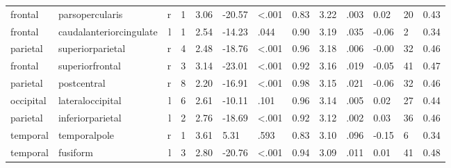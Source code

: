 \documentclass{article}
\begin{document}
\begin{longtable}{llrR{1.3cm}R{1cm}R{1.3cm}R{1cm}R{1cm}R{1.3cm}R{1cm}R{1.8cm}R{1.3cm}R{1.8cm}}
   frontal &           parsopercularis &    r &         1 &                  3.06 &           -20.57 &      \textless.001 &                               0.83 &                          3.22 &                            .003 &   0.02 &     20 &      0.43 \\
   frontal &   caudalanteriorcingulate &    l &         1 &                  2.54 &           -14.23 &               .044 &                               0.90 &                          3.19 &                            .035 &  -0.06 &      2 &      0.34 \\
  parietal &          superiorparietal &    r &         4 &                  2.48 &           -18.76 &      \textless.001 &                               0.96 &                          3.18 &                            .006 &  -0.00 &     32 &      0.46 \\
   frontal &           superiorfrontal &    r &         3 &                  3.14 &           -23.01 &      \textless.001 &                               0.92 &                          3.16 &                            .019 &  -0.05 &     41 &      0.47 \\
  parietal &               postcentral &    r &         8 &                  2.20 &           -16.91 &      \textless.001 &                               0.98 &                          3.15 &                            .021 &  -0.06 &     32 &      0.46 \\
 occipital &          lateraloccipital &    l &         6 &                  2.61 &           -10.11 &               .101 &                               0.96 &                          3.14 &                            .005 &   0.02 &     27 &      0.44 \\
  parietal &          inferiorparietal &    l &         2 &                  2.76 &           -18.69 &      \textless.001 &                               0.92 &                          3.12 &                            .002 &   0.03 &     36 &      0.46 \\
  temporal &              temporalpole &    r &         1 &                  3.61 &             5.31 &               .593 &                               0.83 &                          3.10 &                            .096 &  -0.15 &      6 &      0.34 \\
  temporal &                  fusiform &    l &         3 &                  2.80 &           -20.76 &      \textless.001 &                               0.94 &                          3.09 &                            .011 &   0.01 &     41 &      0.48 \\

\end{longtable}
\end{document}
